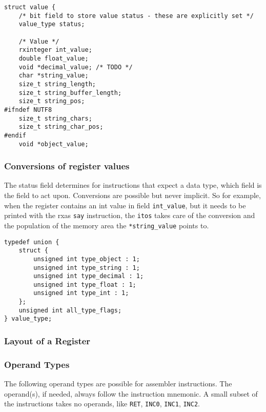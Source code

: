 \documentclass[english,11pt,twoside,toc=bib,toc=idx]{scrreprt}
\newcommand{\crexx}{c\textsc{Rexx}}
\newcommand{\keyword}[1]{\texttt{#1}}
\newcommand{\code}[1]{\texttt{#1}}
\begin{document}
\begin{lstlisting}[style=embed,label=crexxregister,caption={The
\crexx{} Register implementation in C}]
struct value {
    /* bit field to store value status - these are explicitly set */
    value_type status;

    /* Value */
    rxinteger int_value;
    double float_value;
    void *decimal_value; /* TODO */
    char *string_value;
    size_t string_length;
    size_t string_buffer_length;
    size_t string_pos;
#ifndef NUTF8
    size_t string_chars;
    size_t string_char_pos;
#endif
    void *object_value;
\end{lstlisting}

\subsubsection{Conversions of register values}
The status field determines for instructions that expect a data type,
which field is the field to act upon. Conversions are possible but
never implicit. So for example, when the register contains an int
value in field \code{int_value}, but it needs to be printed with the rxas
\keyword{say} instruction, the
\keyword{itos} takes care of the conversion and the population of the
memory area the \code{*string_value} points to. 

\begin{lstlisting}[style=embed,label=crexxregister,caption={Values of
the Status field}]
typedef union {
    struct {
        unsigned int type_object : 1;
        unsigned int type_string : 1;
        unsigned int type_decimal : 1;
        unsigned int type_float : 1;
        unsigned int type_int : 1;
    };
    unsigned int all_type_flags;
} value_type;
\end{lstlisting}

\subsubsection{Layout of a Register}

\subsubsection{Operand Types}

The following operand types are possible for assembler
instructions. The operand(s), if needed, always follow the instruction
mnemonic. A small subset of the instructions takes no operands, like
\keyword{RET}, \keyword{INC0}, \keyword{INC1}, \keyword{INC2}.
\end{document}
